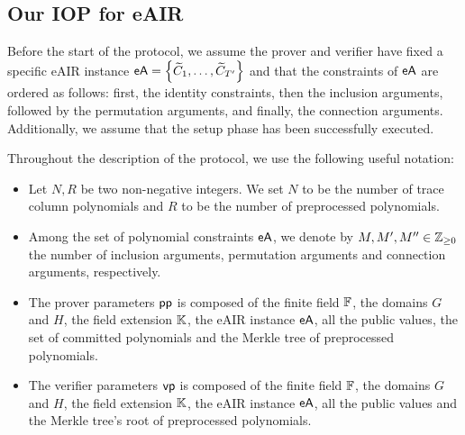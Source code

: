 \subsection{Our IOP for eAIR}\label{sec:our-IOP}

Before the start of the protocol, we assume the prover and verifier have fixed a specific eAIR instance $\textsf{eA} = \left\{\widetilde{C}_1,\dots,\widetilde{C}_{T'}\right\}$ and that the constraints of $\textsf{eA}$ are ordered as follows: first, the identity constraints, then the inclusion arguments, followed by the permutation arguments, and finally, the connection arguments. Additionally, we assume that the setup phase has been successfully executed.

Throughout the description of the protocol, we use the following useful notation:
\begin{itemize}
  \item Let $N,R$ be two non-negative integers. We set $N$ to be the number of trace column polynomials and $R$ to be the number of preprocessed polynomials.
  \item Among the set of polynomial constraints $\textsf{eA}$, we denote by $M, M', M'' \in \mathbb{Z}_{\geq 0}$ the number of inclusion arguments, permutation arguments and connection arguments, respectively. 
  \item The prover parameters $\textsf{pp}$ is composed of the finite field $\mathbb{F}$, the domains $G$ and $H$, the field extension $\mathbb{K}$, the eAIR instance $\textsf{eA}$, all the public values, the set of committed polynomials and the Merkle tree of preprocessed polynomials.
  \item The verifier parameters $\textsf{vp}$ is composed of the finite field $\mathbb{F}$, the domains $G$ and $H$, the field extension $\mathbb{K}$, the eAIR instance $\textsf{eA}$, all the public values and the Merkle tree's root of preprocessed polynomials.
\end{itemize}

